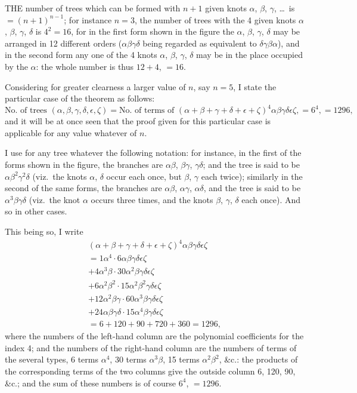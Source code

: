\documentclass[11pt,a4paper]{article}
\begin{document}
THE number of trees which can be formed with $n + 1$ given knots $\alpha$, $\beta$, $\gamma$, \ldots\ is $= (n+1)^{n-1}$; for instance $n = 3$, the number of trees with the 4 given knots $\alpha$, $\beta$, $\gamma$, $\delta$ is $4^2 = 16$, for in the first form shown in the figure the $\alpha$, $\beta$, $\gamma$, $\delta$ may be arranged in 12 different orders ($\alpha\beta\gamma\delta$ being regarded as equivalent to $\delta\gamma\beta\alpha$), and in the second form any one of the 4 knots $\alpha$, $\beta$, $\gamma$, $\delta$ may be in the place occupied by the $\alpha$: the whole number is thus $12 + 4$, $= 16$.

Considering for greater clearness a larger value of $n$, say $n = 5$, I state the particular case of the theorem as follows:
\[
\text{No.\ of trees }(\alpha, \beta, \gamma, \delta, \epsilon, \zeta) = \text{No.\ of terms of }(\alpha + \beta + \gamma + \delta + \epsilon + \zeta)^4 \alpha\beta\gamma\delta\epsilon\zeta, = 6^4, = 1296,
\]
and it will be at once seen that the proof given for this particular case is applicable for any value whatever of $n$.

I use for any tree whatever the following notation: for instance, in the first of the forms shown in the figure, the branches are $\alpha\beta$, $\beta\gamma$, $\gamma\delta$; and the tree is said to be $\alpha\beta^2\gamma^2\delta$ (viz.\ the knots $\alpha$, $\delta$ occur each once, but $\beta$, $\gamma$ each twice); similarly in the second of the same forms, the branches are $\alpha\beta$, $\alpha\gamma$, $\alpha\delta$, and the tree is said to be $\alpha^3\beta\gamma\delta$ (viz.\ the knot $\alpha$ occurs three times, and the knots $\beta$, $\gamma$, $\delta$ each once). And so in other cases.

This being so, I write
\begin{multline*}
(\alpha + \beta + \gamma + \delta + \epsilon + \zeta)^4 \alpha\beta\gamma\delta\epsilon\zeta \\
= 1\alpha^4 \cdot 6\alpha\beta\gamma\delta\epsilon\zeta \\
+ 4\alpha^3\beta \cdot 30\alpha^2\beta\gamma\delta\epsilon\zeta \\
+ 6\alpha^2\beta^2 \cdot 15\alpha^2\beta^2\gamma\delta\epsilon\zeta \\
+ 12\alpha^2\beta\gamma \cdot 60\alpha^3\beta\gamma\delta\epsilon\zeta \\
+ 24\alpha\beta\gamma\delta \cdot 15\alpha^4\beta\gamma\delta\epsilon\zeta \\
= 6 + 120 + 90 + 720 + 360 = 1296,
\end{multline*}
where the numbers of the left-hand column are the polynomial coefficients for the index 4; and the numbers of the right-hand column are the numbers of terms of the several types, 6 terms $\alpha^4$, 30 terms $\alpha^3\beta$, 15 terms $\alpha^2\beta^2$, \&c.: the products of the corresponding terms of the two columns give the outside column 6, 120, 90, \&c.; and the sum of these numbers is of course $6^4$, $= 1296$.
\end{document}
